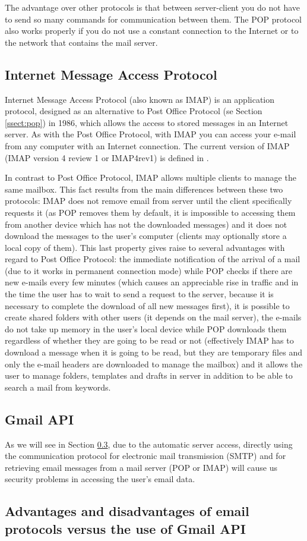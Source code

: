 The advantage over other protocols is that between server-client you do not have to send so many commands for communication between them. The POP protocol also works properly if you do not use a constant connection to the Internet or to the network that contains the mail server.

\subsection{Internet Message Access Protocol} \label{ssect:imap}

Internet Message Access Protocol (also known as IMAP) is an application protocol, designed as an alternative to Post Office Protocol (se Section \ref{ssect:pop}) in 1986, which allows the access to stored messages in an Internet server. As with the Post Office Protocol, with IMAP you can access your e-mail from any computer with an Internet connection. The current version of IMAP (IMAP version 4 review 1 or IMAP4rev1) is defined in \cite{rfc3501}.

In contrast to Post Office Protocol, IMAP allows multiple clients to manage the same mailbox. This fact results from the main differences between these two protocols: IMAP does not remove email from server until the client specifically requests it (as POP removes them by default, it is impossible to accessing them from another device which has not the downloaded messages) and it does not download the messages to the user's computer (clients may optionally store a local copy of them). This last property gives raise to several advantages with regard to Post Office Protocol: the immediate notification of the arrival of a mail (due to it works in permanent connection mode) while POP checks if there are new e-mails every few minutes (which causes an appreciable rise in traffic and in the time the user has to wait to send a request to the server, because it is necessary to complete the download of all new messages first), it is possible to create shared folders with other users (it depends on the mail server), the e-mails do not take up memory in the user's local device while POP downloads them regardless of whether they are going to be read or not (effectively IMAP has to download a message when it is going to be read, but they are temporary files and only the e-mail headers are downloaded to manage the mailbox) and it allows the user to manage folders, templates and drafts in server in addition to be able to search a mail from keywords.

\subsection{Gmail API}\label{ssect:gmailapi}
As we will see in Section \ref{ssect:protvsapi}, due to the automatic server access, directly using the communication protocol for electronic mail transmission (SMTP) and for retrieving email messages from a mail server (POP or IMAP) will cause us security problems in accessing the user's email data.

\subsection{Advantages and disadvantages of email protocols versus the use of Gmail API} \label{ssect:protvsapi}